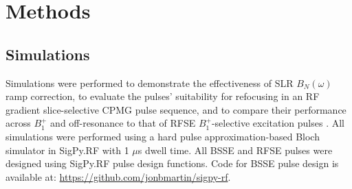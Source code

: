 \documentclass[a4paper,12pt]{article}
\begin{document}
\section*{Methods}
\subsection*{Simulations}
Simulations were performed to demonstrate the effectiveness of SLR $B_N(\omega)$ ramp correction, 
to evaluate the pulses' suitability for refocusing in an RF gradient slice-selective CPMG pulse sequence, 
and to compare their performance across $B_1^+$ and off-resonance to that of RFSE $B_1^+$-selective excitation pulses \cite{Grissom2014B1+-selectiveAlgorithm}. 
All simulations were performed using a hard pulse approximation-based Bloch simulator \cite{Pauly1991ParameterAlgorithm} in SigPy.RF \cite{Martin2020SigPy.RF:Research} with 1 $\mu$s dwell time. 
All BSSE and RFSE pulses were designed using SigPy.RF pulse design functions. 
Code for BSSE pulse design is available at: \url{https://github.com/jonbmartin/sigpy-rf}.
\end{document}
